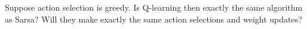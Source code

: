 
\begin{exercise}[Exercise 6.12]

Suppose action selection is greedy. Is Q-learning then exactly the same
algorithm as Sarsa? Will they make exactly the same action selections
and weight updates?

\end{exercise}


\begin{solution}

\phantom{}

\end{solution}

